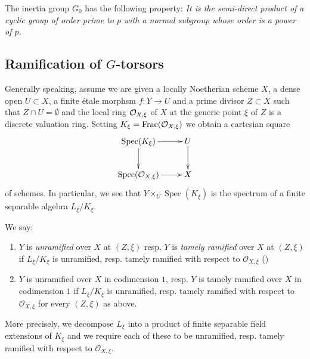 \begin{prop}
    The inertia group $G_0$ has the following property:
    \textit{It is the semi-direct product of a cyclic group of order prime to $p$ with a normal subgroup whose order is a power of $p$.}
\end{prop}







\subsection{Ramification of \texorpdfstring{$G$}{G}-torsors}

Generally speaking, assume we are given a locally Noetherian scheme $X$, 
a dense open $U \subset X$, a finite \'etale morphsm $f: Y \to U$ and a prime divisor $Z \subset X$ such that $Z \cap U = \emptyset$
and the local ring $\mathcal{O}_{X, \xi}$ of $X$ at the generic point $\xi$ of $Z$ is a discrete valuation ring. 
Setting $K_\xi = \operatorname{Frac}(\mathcal{O}_{X, \xi})$ we obtain a cartesian square
\[ \xymatrix{ \mathop{\mathrm{Spec}}(K_\xi ) \ar[r] \ar[d] & U \ar[d] \\ \mathop{\mathrm{Spec}}(\mathcal{O}_{X, \xi }) \ar[r] & X } \]
of schemes. 
In particular, we see that $Y \times _ U \mathop{\mathrm{Spec}}(K_\xi )$ is the spectrum of a finite separable algebra $L_\xi /K_\xi $. 
\begin{definition}\label{definition:tamely_ramified_in_codim_1:reorg}
We say: 
\begin{enumerate}
    \item $Y$ is \textit{unramified} over $X$ at $(Z, \xi)$ resp. $Y$ is \textit{tamely ramified} over $X$ at $(Z, \xi)$
        if $L_\xi /K_\xi $ is unramified, resp. tamely ramified with respect to $\mathcal{O}_{X, \xi }$
        ()
    
    \item $Y$ is unramified over $X$ in codimension $1$, resp. $Y$ is tamely ramified over $X$ in codimension $1$ if $L_\xi /K_\xi $ is unramified, resp. tamely ramified 
    with respect to $\mathcal{O}_{X, \xi }$ for every $(Z, \xi )$ as above. 
\end{enumerate}

More precisely, we decompose $L_\xi $ into a product of finite separable field extensions of $K_\xi $ and we require each of these to be unramified, resp. tamely ramified with 
respect to $\mathcal{O}_{X, \xi }$.

\end{definition}

